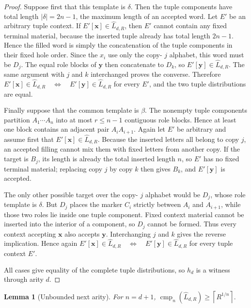 \documentclass[10pt,a4paper]{article}
\newtheorem{lemma}[theorem]{Lemma}
\theoremstyle{definition}
\theoremstyle{remark}
\newcommand{\cmp}{\operatorname{cmp}}
\begin{document}
\begin{proof}
Suppose first that this template is \(\delta\).  Then the tuple
components have total length \(|\delta|=2n-1\), the maximum length of an
accepted word.  Let \(E'\) be an arbitrary tuple context.  If
\(E'[\mathbf x]\in\widehat L_{d,R}\), then \(E'\) cannot contain any
fixed terminal material, because the inserted tuple already has total length
\(2n-1\).  Hence the filled word is simply the concatenation of the tuple
components in their fixed hole order.  Since the \(x_i\) use only the copy-%
\(j\) alphabet, this word must be \(D_j\).  The equal role blocks of
\(\mathbf y\) then concatenate to \(D_k\), so
\(E'[\mathbf y]\in\widehat L_{d,R}\).  The same argument with
\(j\) and \(k\) interchanged proves the converse.  Therefore
\(E'[\mathbf x]\in\widehat L_{d,R} \quad\Longleftrightarrow\quad E'[\mathbf y]\in\widehat L_{d,R}\)
for every \(E'\), and the two tuple distributions are equal.

Finally suppose that the common template is \(\beta\).  The nonempty tuple
components partition \(A_1\cdots A_n\) into at most \(r\le n-1\)
contiguous role blocks.  Hence at least one block contains an adjacent pair
\(A_iA_{i+1}\).  Again let \(E'\) be arbitrary and assume first that
\(E'[\mathbf x]\in\widehat L_{d,R}\).  Because the inserted letters all
belong to copy \(j\), an accepted filling cannot mix them with fixed letters
from another copy.  If the target is \(B_j\), its length is already the total
inserted length \(n\), so \(E'\) has no fixed terminal material; replacing
copy \(j\) by copy \(k\) then gives \(B_k\), and
\(E'[\mathbf y]\) is accepted.

The only other possible target over the copy-%
\(j\) alphabet would be \(D_j\), whose role template is \(\delta\).
But \(D_j\) places the marker \(C_i\) strictly between
\(A_i\) and \(A_{i+1}\), while those two roles lie inside one tuple
component.  Fixed context material cannot be inserted into the interior of a
component, so \(D_j\) cannot be formed.  Thus every context accepting
\(\mathbf x\) also accepts \(\mathbf y\).  Interchanging \(j\) and
\(k\) gives the reverse implication.  Hence again
\(E'[\mathbf x]\in\widehat L_{d,R} \quad\Longleftrightarrow\quad E'[\mathbf y]\in\widehat L_{d,R}\)
for every tuple context \(E'\).

All cases give equality of the complete tuple distributions, so \(h_d\) is a
witness through arity \(d\).
\end{proof}

\begin{lemma}[Unbounded next arity]
\label{vab:lem:high}
For \(n=d+1\), \(\cmp_n(\widehat L_{d,R}) \ge \left\lceil R^{1/n}\right\rceil.\) \end{lemma}
\end{document}
